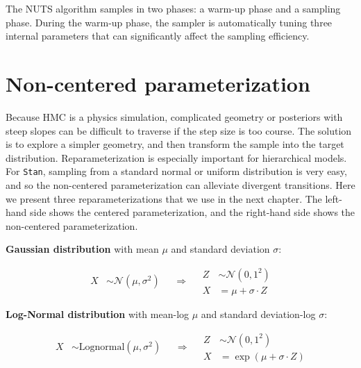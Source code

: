 \documentclass[11pt, oneside, openany]{scrbook}
\begin{document}
The NUTS algorithm samples in two phases: a warm-up phase and a sampling phase. During the warm-up phase, the sampler is automatically tuning three internal parameters that can significantly affect the sampling efficiency.

\hypertarget{non-centered-parameterization}{%
\section{Non-centered parameterization}\label{non-centered-parameterization}}

Because HMC is a physics simulation, complicated geometry or posteriors with steep slopes can be difficult to traverse if the step size is too course. The solution is to explore a simpler geometry, and then transform the sample into the target distribution. Reparameterization is especially important for hierarchical models. For \texttt{Stan}, sampling from a standard normal or uniform distribution is very easy, and so the non-centered parameterization can alleviate divergent transitions. Here we present three reparameterizations that we use in the next chapter. The left-hand side shows the centered parameterization, and the right-hand side shows the non-centered parameterization.

\textbf{Gaussian distribution} with mean \(\mu\) and standard deviation \(\sigma\):


\begin{equation}
  \begin{split}
    X &\sim \mathcal{N}(\mu, \sigma^2)
  \end{split}
\quad \Longrightarrow \quad
  \begin{split}
    Z &\sim \mathcal{N}(0, 1^2) \\
    X &= \mu + \sigma \cdot Z
  \end{split}
\label{eq:nc-normal}
\end{equation}

\textbf{Log-Normal distribution} with mean-log \(\mu\) and standard deviation-log \(\sigma\):


\begin{equation}
  \begin{split}
    X &\sim \mathrm{Lognormal}(\mu, \sigma^2)
  \end{split}
\quad \Longrightarrow \quad
  \begin{split}
    Z &\sim \mathcal{N}(0, 1^2) \\
    X &= \exp\left(\mu + \sigma \cdot Z\right)
  \end{split}
\label{eq:nc-lognormal}
\end{equation}
\end{document}
